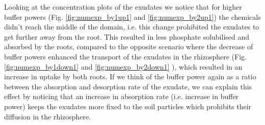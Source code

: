 \documentclass[11pt]{article}
\numberwithin{equation}{section}
\begin{document}
Looking at the concentration plots of the exudates we notice that for higher buffer powers (Fig. \ref{fig:numexp_by1up1} and \ref{fig:numexp_by2up1}) the chemicals didn't reach the middle of the domain, i.e. this change prohibited the exudates to get further away from the root. This resulted in less phosphate solubilised and absorbed by the roots, compared to the opposite scenario where the decrease of buffer powers enhanced the transport of the exudates in the rhizosphere (Fig. \ref{fig:numexp_by1down1} and \ref{fig:numexp_by2down1} ), which resulted in an increase in uptake by both roots. If we think of the buffer power again as a ratio between the absorption and desorption rate of the exudate, we can explain this effect by noticing that an increase in absorption rate (i.e. increase in buffer power) keeps the exudates more fixed to the soil particles which prohibits their diffusion in the rhizosphere.
\vspace{-0.3cm}
\end{document}
